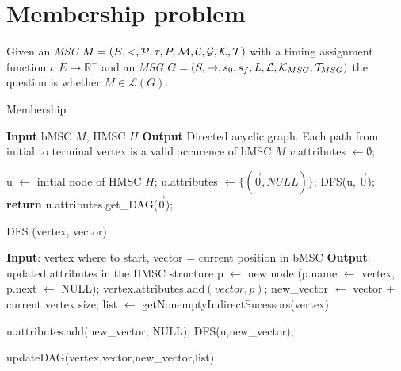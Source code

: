 \documentclass{article}
\newcommand{\type}{{\tau}}
\newcommand{\proc}{{P}}
\newcommand{\procSet}{{\cal P}}
\newcommand{\match}{{\cal M}}
\newcommand{\coregs}{{\cal C}}
\newcommand{\genord}{{\cal G}}
\newcommand{\MSCmap}{{\it L}}
\newcommand{\MSCs}{{\cal L}}
\newcommand{\timerSet}{{\cal T}}
\newcommand{\timerMSGSet}{{{\cal T}_{MSG}}}
\newcommand{\intConstraintSet}{{\cal K}}
\newcommand{\intConstraintMSGSet}{{\cal K}_{MSG}}
\newcommand{\timingAssignment }{{\iota}}
\begin{document}
\section*{Membership problem}
Given an \emph{MSC} $ M =
(E,<,\procSet,\type,\proc,\match,\coregs,\genord,\intConstraintSet, \timerSet)$
with a timing assignment function $\timingAssignment : E \rightarrow \mathbb{R}^{+}$
and an \emph{MSG} $G = (S, \rightarrow, s_0, s_f, \MSCmap, \MSCs,
\intConstraintMSGSet, \timerMSGSet )$ the question is whether $M \in
\mathcal{L}(G)$.


\begin{algorithm}
\caption{Membership}
\begin{algorithmic}[1]


\STATE \textbf{Input} bMSC $M$,  HMSC $H$
\STATE \textbf{Output} Directed acyclic graph. Each path from initial to terminal vertex is a valid occurence of bMSC $M$
\STATE 
\STATE {}
\STATE $v$.attributes $\leftarrow \emptyset$;
\ENDFOR

\STATE u $\leftarrow$ initial node of HMSC $H$;
\STATE u.attributes $\leftarrow \{(\vec{0},NULL)\}$;
\STATE DFS(u, $\vec{0}$);
\STATE \textbf{return} u.attributes.get\_DAG($\vec{0}$);

\end{algorithmic}
\end{algorithm}


\begin{algorithm}
\caption{DFS (vertex, vector)}
\label{alg:DFS}
\begin{algorithmic}[1]
\STATE \textbf{Input}: vertex where to start, vector = current position in bMSC
\STATE \textbf{Output}: updated attributes in the HMSC structure
\STATE
\STATE {}
\STATE *p $\leftarrow$ new node (p.name $\leftarrow$ vertex, p.next $\leftarrow$ NULL);
\STATE vertex.attributes.add$ (vector, p)$;
\STATE 
{}
\STATE new\_vector $\leftarrow$ vector + current vertex size;
\STATE 
\STATE list $\leftarrow$ getNonemptyIndirectSucessors(vertex)

\STATE
\STATE {}

\STATE u.attributes.add(new\_vector, NULL);
\STATE DFS(u,new\_vector);


\ENDIF
\ENDFOR
\STATE
\STATE {}
\STATE updateDAG(vertex,vector,new\_vector,list)


\ENDIF


\end{algorithmic}
\end{algorithm}
\end{document}
